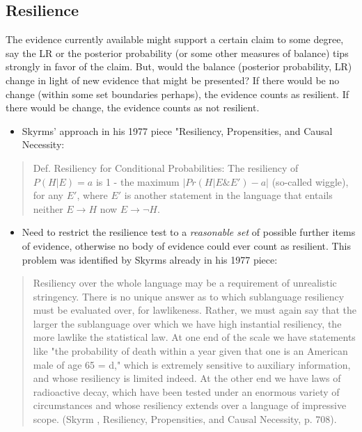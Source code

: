 \documentclass[
  10pt,
  dvipsnames,enabledeprecatedfontcommands]{scrartcl}
\providecommand{\tightlist}{%
  \setlength{\itemsep}{0pt}\setlength{\parskip}{0pt}}
\begin{document}

\hypertarget{resilience}{%
\subsection{Resilience}\label{resilience}}

The evidence currently available might support a certain claim to some
degree, say the LR or the posterior probability (or some other measures
of balance) tips strongly in favor of the claim. But, would the balance
(posterior probability, LR) change in light of new evidence that might
be presented? If there would be no change (within some set boundaries
perhaps), the evidence counts as resilient. If there would be change,
the evidence counts as not resilient.

\begin{itemize}
\tightlist
\item
  Skyrms' approach in his 1977 piece "Resiliency, Propensities, and
  Causal Necessity:
\end{itemize}

\begin{quote}
Def. Resiliency for Conditional Probabilities: The resiliency of $P(H \vert E) = a$ 
is 1 - the maximum $\vert Pr(H \vert E \& E') - a \vert$ (so-called wiggle), for any $E'$, where $E'$ is another statement in the language that entails neither $E \rightarrow H$ now $E \rightarrow \neg H$.
\end{quote}

\begin{itemize}
\tightlist
\item
  Need to restrict the resilience test to a \emph{reasonable set} of
  possible further items of evidence, otherwise no body of evidence
  could ever count as resilient. This problem was identified by Skyrms
  already in his 1977 piece:
\end{itemize}

\begin{quote}
Resiliency over the whole language may be a requirement of unrealistic stringency. There is no unique answer as to which sublanguage resiliency must be evaluated over, for lawlikeness. Rather, we must again say that the larger the sublanguage over which we have high instantial resiliency, the more lawlike the statistical law. At one end of the scale we have statements like "the probability of death within a year given that one is an American male of age 65 = d," which is extremely sensitive to auxiliary information, and whose resiliency is limited indeed. At the other end we have laws of radioactive decay, which have been tested under an enormous variety of circumstances and whose resiliency extends over a language of impressive scope. (Skyrm , Resiliency, Propensities, and Causal Necessity, p. 708).
\end{quote}
\end{document}
